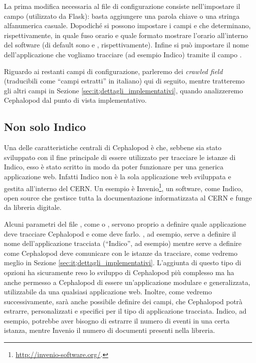             La prima modifica necessaria al file di configurazione consiste nell'impostare il campo  (utilizzato da Flask): basta aggiungere una parola chiave o una stringa alfanumerica casuale. Dopodiché si possono impostare i campi  e  che determinano, rispettivamente, in quale fuso orario e quale formato mostrare l'orario all'interno del software (di default sono  e , rispettivamente). Infine si può impostare il nome dell'applicazione che vogliamo tracciare (ad esempio Indico) tramite il campo .
            
            Riguardo ai restanti campi di configurazione, parleremo dei \textit{crawled field} (traducibili come ``campi estratti'' in italiano) qui di seguito, mentre tratteremo gli altri campi in Sezione \ref{sec:it;dettagli_implementativi}, quando analizzeremo Cephalopod dal punto di vista implementativo.
            
        \subsection{Non solo Indico} \label{sec:it;cp;non_solo_indico}
        
            Una delle caratteristiche centrali di Cephalopod è che, sebbene sia stato sviluppato con il fine principale di essere utilizzato per tracciare le istanze di Indico, esso è stato scritto in modo da poter funzionare per una generica applicazione web. Infatti Indico non è la sola applicazione web sviluppata e gestita all'interno del \ac{CERN}. Un esempio è Invenio\footnote{\url{http://invenio-software.org/}.}, un software, come Indico, open source che gestisce tutta la documentazione informatizzata al \ac{CERN} e funge da libreria digitale.
            
            Alcuni parametri del file , come  o , servono proprio a definire quale applicazione deve tracciare Cephalopod e come deve farlo. , ad esempio, serve a definire il nome dell'applicazione tracciata (``Indico'', ad esempio) mentre  serve a definire come Cephalopod deve comunicare con le istanze da tracciare, come vedremo meglio in Sezione \ref{sec:it;dettagli_implementativi}. L'aggiunta di questo tipo di opzioni ha sicuramente reso lo sviluppo di Cephalopod più complesso ma ha anche permesso a Cephalopod di essere un'applicazione modulare e generalizzata, utilizzabile da una qualsiasi applicazione web. Inoltre, come vedremo successivamente, sarà anche possibile definire dei campi, che Cephalopod potrà estrarre, personalizzati e specifici per il tipo di applicazione tracciata. Indico, ad esempio, potrebbe aver bisogno di estrarre il numero di eventi in una certa istanza, mentre Invenio il numero di documenti presenti nella libreria.
            
